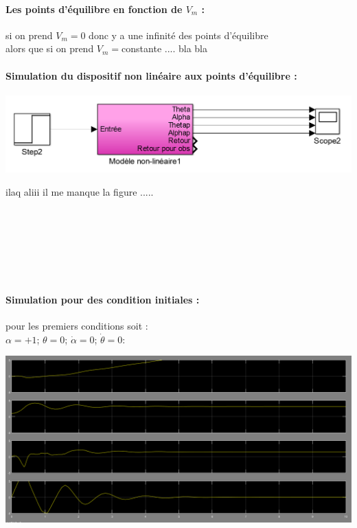 \documentclass[12pt, a4paper, openany]{report}
\begin{document}
 \paragraph{Les points d'équilibre en fonction de $V_{m}$ :\\}
 
 si on prend  $V_{m}=0$ donc y a une infinité des points d'équilibre \\
 alors que si on prend $V_{m}=$constante   .... bla bla \\
 
  \paragraph{Simulation du dispositif non linéaire aux points d'équilibre :\\}
 
  
\begin{center}
\includegraphics[scale=0.5]{modelenonlineairesimulink.png}
\label{fig1} 
\end{center} 
 
 ilaq aliii il me manque la figure ..... \\\\\\\\\\\\\\
 
 \paragraph{Simulation pour des condition initiales :\\} 
 
 pour les premiers conditions soit :\\
$\alpha=+1$; $\theta=0$; $\dot{\alpha}=0$; $\dot{\theta} = 0:$ \\
                                                   
\begin{center}
\includegraphics[scale=0.4]{alpha=+1.PNG}
\label{fig1} 
\end{center}
 
\end{document}
